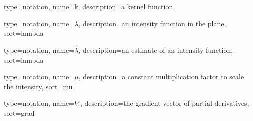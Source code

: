 


{%
   type=notation,
   name={k},
   description={a kernel function}
}

{%
   type=notation,
   name={\ensuremath{\lambda}},
   description={an intensity function in the plane},
   sort={lambda}
}

{%
   type=notation,
   name={\ensuremath{\hat{\lambda}}},
   description={an estimate of an intensity function},
   sort={lambda}
}

{%
   type=notation,
   name={\ensuremath{\mu}},
   description={a constant multiplication factor to scale the intensity},
   sort={mu}
}

{%
   type=notation,
   name={\ensuremath{\nabla}},
   description={the gradient vector of partial derivatives},
   sort={grad}
}


